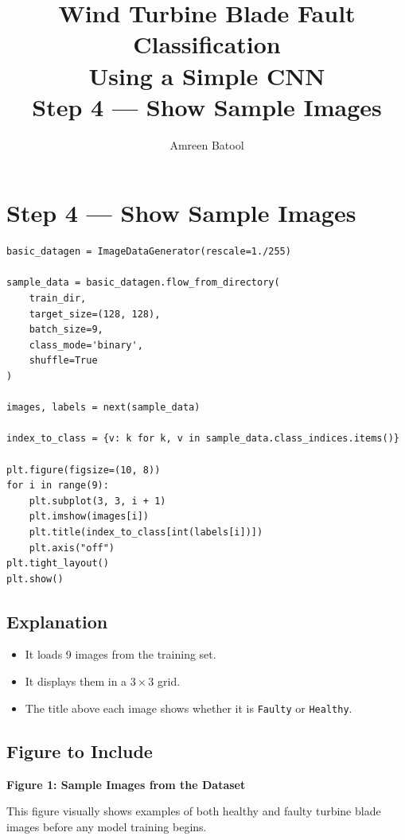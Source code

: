 \documentclass[12pt]{article}
\title{\textbf{Wind Turbine Blade Fault Classification\\Using a Simple CNN}\\[0.5em]
\large Step 4 --- Show Sample Images}
\author{Amreen Batool}
\date{}
\begin{document}
\maketitle

\section*{Step 4 --- Show Sample Images}

\begin{lstlisting}[style=pythonstyle]
basic_datagen = ImageDataGenerator(rescale=1./255)

sample_data = basic_datagen.flow_from_directory(
    train_dir,
    target_size=(128, 128),
    batch_size=9,
    class_mode='binary',
    shuffle=True
)

images, labels = next(sample_data)

index_to_class = {v: k for k, v in sample_data.class_indices.items()}

plt.figure(figsize=(10, 8))
for i in range(9):
    plt.subplot(3, 3, i + 1)
    plt.imshow(images[i])
    plt.title(index_to_class[int(labels[i])])
    plt.axis("off")
plt.tight_layout()
plt.show()
\end{lstlisting}

\subsection*{Explanation}

\begin{itemize}
    \item It loads 9 images from the training set.
    \item It displays them in a $3 \times 3$ grid.
    \item The title above each image shows whether it is \texttt{Faulty} or \texttt{Healthy}.
\end{itemize}

\subsection*{Figure to Include}

\textbf{Figure 1: Sample Images from the Dataset}

\noindent This figure visually shows examples of both healthy and faulty turbine blade images before any model training begins.
\end{document}
